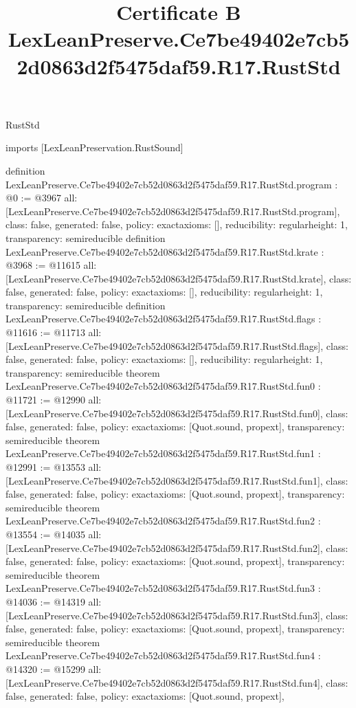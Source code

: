 \begin{lexlean}{RustStd}
\title{Certificate B LexLeanPreserve.Ce7be49402e7cb52d0863d2f5475daf59.R17.RustStd}
\begin{coremodule}
imports [LexLeanPreservation.RustSound]

definition LexLeanPreserve.Ce7be49402e7cb52d0863d2f5475daf59.R17.RustStd.program : @0 := @3967 {
  all: [LexLeanPreserve.Ce7be49402e7cb52d0863d2f5475daf59.R17.RustStd.program],
  class: false,
  generated: false,
  policy: exact{axioms: []},
  reducibility: regular{height: 1},
  transparency: semireducible
}
definition LexLeanPreserve.Ce7be49402e7cb52d0863d2f5475daf59.R17.RustStd.krate : @3968 := @11615 {
  all: [LexLeanPreserve.Ce7be49402e7cb52d0863d2f5475daf59.R17.RustStd.krate],
  class: false,
  generated: false,
  policy: exact{axioms: []},
  reducibility: regular{height: 1},
  transparency: semireducible
}
definition LexLeanPreserve.Ce7be49402e7cb52d0863d2f5475daf59.R17.RustStd.flags : @11616 := @11713 {
  all: [LexLeanPreserve.Ce7be49402e7cb52d0863d2f5475daf59.R17.RustStd.flags],
  class: false,
  generated: false,
  policy: exact{axioms: []},
  reducibility: regular{height: 1},
  transparency: semireducible
}
theorem LexLeanPreserve.Ce7be49402e7cb52d0863d2f5475daf59.R17.RustStd.fun0 : @11721 := @12990 {
  all: [LexLeanPreserve.Ce7be49402e7cb52d0863d2f5475daf59.R17.RustStd.fun0],
  class: false,
  generated: false,
  policy: exact{axioms: [Quot.sound, propext]},
  transparency: semireducible
}
theorem LexLeanPreserve.Ce7be49402e7cb52d0863d2f5475daf59.R17.RustStd.fun1 : @12991 := @13553 {
  all: [LexLeanPreserve.Ce7be49402e7cb52d0863d2f5475daf59.R17.RustStd.fun1],
  class: false,
  generated: false,
  policy: exact{axioms: [Quot.sound, propext]},
  transparency: semireducible
}
theorem LexLeanPreserve.Ce7be49402e7cb52d0863d2f5475daf59.R17.RustStd.fun2 : @13554 := @14035 {
  all: [LexLeanPreserve.Ce7be49402e7cb52d0863d2f5475daf59.R17.RustStd.fun2],
  class: false,
  generated: false,
  policy: exact{axioms: [Quot.sound, propext]},
  transparency: semireducible
}
theorem LexLeanPreserve.Ce7be49402e7cb52d0863d2f5475daf59.R17.RustStd.fun3 : @14036 := @14319 {
  all: [LexLeanPreserve.Ce7be49402e7cb52d0863d2f5475daf59.R17.RustStd.fun3],
  class: false,
  generated: false,
  policy: exact{axioms: [Quot.sound, propext]},
  transparency: semireducible
}
theorem LexLeanPreserve.Ce7be49402e7cb52d0863d2f5475daf59.R17.RustStd.fun4 : @14320 := @15299 {
  all: [LexLeanPreserve.Ce7be49402e7cb52d0863d2f5475daf59.R17.RustStd.fun4],
  class: false,
  generated: false,
  policy: exact{axioms: [Quot.sound, propext]},
}
\end{coremodule}
\end{lexlean}
